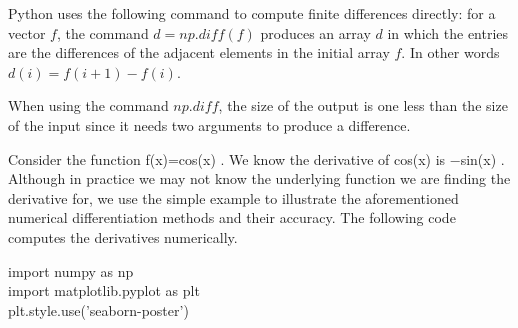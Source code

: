 %


Python uses the following command to compute finite differences directly: for a vector $f$, the command $d=np.diff(f)$ produces an array $d$ in which the entries are the differences of the adjacent elements in the initial array $f$. In other words $d(i)=f(i+1)-f(i)$.



When using the command $np.diff$, the size of the output is one less than the size of the input since it needs two arguments to produce a difference.


\begin{example}
Consider the function f(x)=cos(x)
. We know the derivative of cos(x)
 is −sin(x)
. Although in practice we may not know the underlying function we are finding the derivative for, we use the simple example to illustrate the aforementioned numerical differentiation methods and their accuracy. The following code computes the derivatives numerically.
\end{example}

\begin{boxB}
import numpy as np\\
import matplotlib.pyplot as plt\\
plt.style.use('seaborn-poster')\\
\end{boxB}

